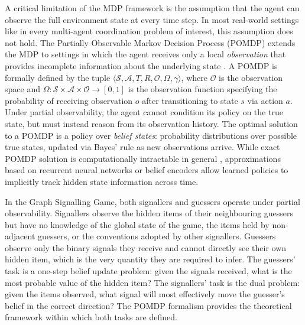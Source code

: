 \documentclass[a4paper,twoside,12pt]{report}
\begin{document}
    A critical limitation of the MDP framework is the assumption that the agent
    can observe the full environment state at every time step. In most real-world
    settings like in every multi-agent coordination problem of interest, this
    assumption does not hold. The Partially Observable Markov Decision Process
    (POMDP) extends the MDP to settings in which the agent receives only a local
    \emph{observation} that provides incomplete information
    about the underlying state  \citep{kaelbling1998}. A POMDP
    is formally defined by the tuple $\langle \mathcal{S}, \mathcal{A}, T, R,
    \mathcal{O}, \Omega, \gamma \rangle$, where $\mathcal{O}$ is the observation
    space and $\Omega : \mathcal{S} \times \mathcal{A} \times \mathcal{O} \to
    [0,1]$ is the observation function specifying the probability of receiving
    observation $o$ after transitioning to state $s$ via action $a$. Under partial observability, the agent cannot condition its policy on the true
    state, but must instead reason from its
    observation history. The optimal solution to a POMDP is a policy over
    \emph{belief states}: probability distributions over possible true states,
    updated via Bayes' rule as new observations arrive. While exact POMDP solution
    is computationally intractable in general \citep{kaelbling1998}, approximations
    based on recurrent neural networks or belief encoders allow learned policies to
    implicitly track hidden state information across time. 
    \newline
    
    In the Graph Signalling Game, both signallers and guessers operate under partial observability.
    Signallers observe the hidden items of their neighbouring guessers but have no
    knowledge of the global state of the game, the items held by non-adjacent
    guessers, or the conventions adopted by other signallers. Guessers observe only
    the binary signals they receive and cannot directly see their own hidden item, which is 
    the very quantity they are required to infer. The guessers' task is a one-step
    belief update problem: given the signals received, what is the most probable
    value of the hidden item? The signallers' task is the dual problem: given the
    items observed, what signal will most effectively move the guesser's belief in
    the correct direction? The POMDP formalism provides the theoretical framework
    within which both tasks are defined.
    
    
\end{document}
